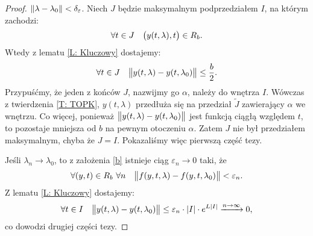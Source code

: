 \begin{proof}
  $\norm{\lambda - \lambda_0} < \delta_{\varepsilon}$.
  Niech $J$ będzie maksymalnym podprzedziałem $I$, na którym zachodzi:
%
  \begin{equation*}
    \forall t \in J \quad \p[\big]{ y(t,\lambda), t } \in R_b.
  \end{equation*}
%
  Wtedy z lematu \ref{L: Kluczowy} dostajemy:
%
  \begin{equation*}
    \forall t \in J \quad \norm[\big]{ y(t,\lambda) - y(t,\lambda_0) } \leq \frac b2.
  \end{equation*}
%
  Przypuśćmy, że jeden z końców $J$, nazwijmy go $\alpha$, należy do wnętrza $I$. Wówczas z twierdzenia \ref{T: TOPK}, 
  $y(t,\lambda)$ przedłuża się na przedział $\widetilde{J}$ zawierający $\alpha$ we wnętrzu. Co więcej, ponieważ 
  $\norm[\big]{ y(t,\lambda) - y(t,\lambda_0) }$ jest funkcją ciągłą względem $t$, to pozostaje mniejsza od $b$ na 
  pewnym otoczeniu $\alpha$. Zatem $J$ nie był przedziałem maksymalnym, chyba że $J = I$. Pokazaliśmy więc pierwszą 
  część tezy.
  
  Jeśli $\lambda_n \to \lambda_0$, to z założenia \ref{b} istnieje ciąg $\varepsilon_n \to 0$ taki, że
%
  \begin{equation*}
    \forall (y,t) \in R_b \ \forall n \quad \norm[\big]{ f(y,t,\lambda) - f(y,t,\lambda_0) } < \varepsilon_n.
  \end{equation*}
%
  Z lematu \ref{L: Kluczowy} dostajemy:
%
  \begin{equation*}
    \forall t \in I \quad \norm[\big]{ y(t,\lambda) - y(t,\lambda_0) } \leq
    \varepsilon_n \cdot \abs{I} \cdot e^{L \abs{I}} \xrightarrow{n\to\infty} 0,
  \end{equation*}
%
  co dowodzi drugiej części tezy.
\end{proof}


































